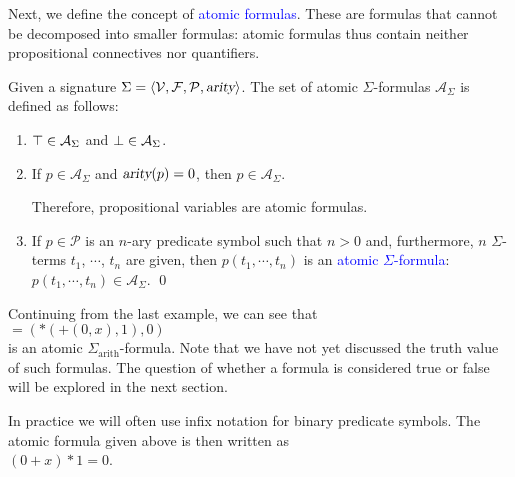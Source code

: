 Next, we define the concept of \textcolor{blue}{atomic formulas}. These are formulas
that cannot be decomposed into smaller formulas: atomic formulas thus contain neither propositional connectives
nor quantifiers. 
\begin{Definition}
  Given a signature $\Sigma = \langle \mathcal{V}, \mathcal{F}, \mathcal{P}, \textsl{arity} \rangle$. 
  The set of atomic $\Sigma$-formulas $\mathcal{A}_\Sigma$ 
  is defined as follows:
  \begin{enumerate}
  \item $\top \in \mathcal{A}_\Sigma$ and  $\bot \in \mathcal{A}_\Sigma$.
  \item If $p \in \mathcal{A}_\Sigma$ and $\textsl{arity}(p)= 0$, then $p \in \mathcal{A}_\Sigma$.

        Therefore, propositional variables are atomic formulas.
  \item If $p \in \mathcal{P}$ is an $n$-ary predicate symbol such that $n > 0$ and, furthermore,  $n$ $\Sigma$-terms
        $t_1$, $\cdots$, $t_n$ are given, then  $p(t_1,\cdots,t_n)$ is an \textcolor{blue}{atomic $\Sigma$-formula}: \\[0.2cm]
        \hspace*{1.3cm} $p(t_1,\cdots,t_n) \in \mathcal{A}_\Sigma$.  \qed
  \end{enumerate}
\end{Definition}

\exampleEng
Continuing from the last example, we can see that \\[0.2cm]
\hspace*{1.3cm} $\mathtt{=}(*(\mathtt{+}(0,x),1),0)$ \\[0.2cm]
is an atomic $\Sigma_\mathrm{arith}$-formula. Note that we have not yet discussed the truth value of such
formulas. The question of whether a formula is considered true or false
will be explored in the next section.

In practice we will often use infix notation for binary predicate symbols.  The atomic formula given above is then
written as
\\[0.2cm]
\hspace*{1.3cm}
$(0 + x) * 1 = 0$.
\eox


